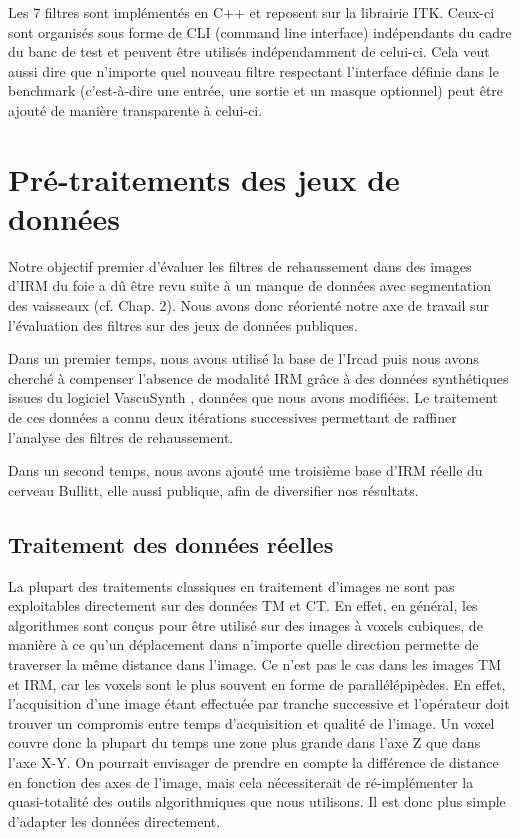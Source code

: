 Les 7 filtres sont implémentés en C++ et reposent sur la librairie ITK. Ceux-ci sont organisés sous forme de CLI (command line interface) indépendants du cadre du banc de test et peuvent être utilisés indépendamment de celui-ci. Cela veut aussi dire que n'importe quel nouveau filtre respectant l'interface définie dans le benchmark (c'est-à-dire une entrée, une sortie et un masque optionnel) peut être ajouté de manière transparente à celui-ci.

\section{Pré-traitements des jeux de données}
\label{sec:Benchmark:traitement_des_données}

Notre objectif premier d'évaluer les filtres de rehaussement dans des images d'IRM du foie a dû être revu suite à un manque de données avec segmentation des vaisseaux (cf. Chap. 2). Nous avons donc réorienté notre axe de travail sur l'évaluation des filtres sur des jeux de données publiques.

Dans un premier temps, nous avons utilisé la base de l'Ircad puis nous avons cherché à compenser l'absence de modalité IRM grâce à des données synthétiques issues du logiciel VascuSynth \cite{Hamarneh2010_vascuSynth}, données que nous avons modifiées. Le traitement de ces données a connu deux itérations successives permettant de raffiner l'analyse des filtres de rehaussement.

Dans un second temps, nous avons ajouté une troisième base d'IRM réelle du cerveau Bullitt, elle aussi publique, afin de diversifier nos résultats.

\subsection{Traitement des données réelles}

La plupart des traitements classiques en traitement d'images ne sont pas exploitables directement sur des données TM et CT. En effet, en général, les algorithmes sont conçus pour être utilisé sur des images à voxels cubiques, de manière à ce qu'un déplacement dans n'importe quelle direction permette de traverser la même distance dans l'image. Ce n'est pas le cas dans les images TM et IRM, car les voxels sont le plus souvent en forme de parallélépipèdes. En effet, l'acquisition d'une image étant effectuée par tranche successive et l'opérateur doit trouver un compromis entre temps d'acquisition et qualité de l'image. Un voxel couvre donc la plupart du temps une zone plus grande dans l'axe Z que dans l'axe X-Y. On pourrait envisager de prendre en compte la différence de distance en fonction des axes de l'image, mais cela nécessiterait de ré-implémenter la quasi-totalité des outils algorithmiques que nous utilisons. Il est donc plus simple d'adapter les données directement.


